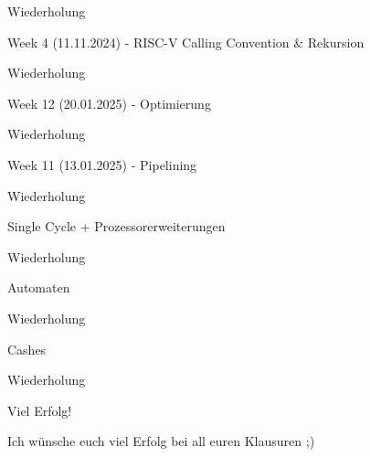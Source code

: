 \documentclass[
  german,            %
  aspectratio=169,    %
]{tumbeamer}
\begin{document}
\begin{frame}[c]{}{}
	\begin{center}
	  \LARGE Wiederholung
	\end{center}
\end{frame}

\begin{frame}[c]{Week 4 (11.11.2024) - RISC-V Calling Convention \& Rekursion}{}
	\begin{center}
	  \LARGE Wiederholung
	\end{center}
\end{frame}

\begin{frame}[c]{Week 12 (20.01.2025) - Optimierung}{}
	\begin{center}
	  \LARGE Wiederholung
	\end{center}
\end{frame}

\begin{frame}[c]{Week 11 (13.01.2025) - Pipelining}{}
	\begin{center}
	  \LARGE Wiederholung
	\end{center}
\end{frame}

\begin{frame}[c]{Single Cycle + Prozessorerweiterungen}{}
	\begin{center}
	  \LARGE Wiederholung
	\end{center}
\end{frame}

\begin{frame}[c]{Automaten}{}
	\begin{center}
	  \LARGE Wiederholung
	\end{center}
\end{frame}

\begin{frame}[c]{Cashes}{}
	\begin{center}
	  \LARGE Wiederholung
	\end{center}
\end{frame}

\begin{frame}[c]{Viel Erfolg!}{}
  \begin{center}
	\LARGE Ich wünsche euch viel Erfolg bei all euren Klausuren ;)
  \end{center}
\end{frame}
\end{document}
